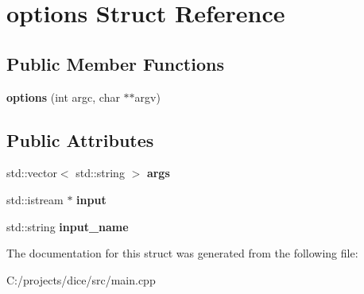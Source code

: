 \hypertarget{structoptions}{}\section{options Struct Reference}
\label{structoptions}
\subsection*{Public Member Functions}
\begin{DoxyCompactItemize}
\item 
\mbox{\label{structoptions_ab376d0aaddda72a964ce52343a998108}} 
{\bfseries options} (int argc, char $\ast$$\ast$argv)
\end{DoxyCompactItemize}
\subsection*{Public Attributes}
\begin{DoxyCompactItemize}
\item 
\mbox{\label{structoptions_a9f001831f97e3c6efb3b1fe0180c6c2e}} 
std\+::vector$<$ std\+::string $>$ {\bfseries args}
\item 
\mbox{\label{structoptions_aab9db55300fd148286188044ae96a41a}} 
std\+::istream $\ast$ {\bfseries input}
\item 
\mbox{\label{structoptions_a3c67beda9f93c75f6815b24f0d660e2a}} 
std\+::string {\bfseries input\+\_\+name}
\end{DoxyCompactItemize}


The documentation for this struct was generated from the following file\+:\begin{DoxyCompactItemize}
\item 
C\+:/projects/dice/src/main.\+cpp\end{DoxyCompactItemize}
